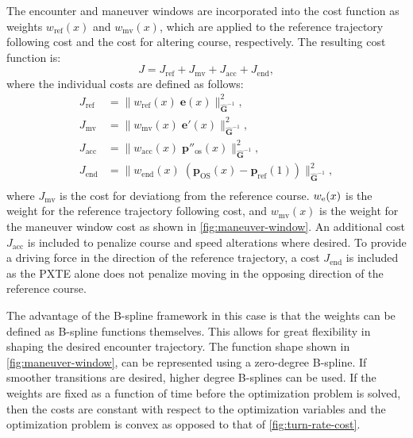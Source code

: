 The encounter and maneuver windows are incorporated into the cost function as weights $w_\text{ref}(x)$ and $w_\text{mv}(x)$, which are applied to the reference trajectory following cost and the cost for altering course, respectively. The resulting cost function is:
\begin{equation}\label{eq:cost-maneuver-window-total}
    J = J_\text{ref} + J_\text{mv} + J_\mathrm{acc} + J_\mathrm{end},
\end{equation}
where the individual costs are defined as follows:
\begin{subequations}\label{eq:cost-maneuver-window}
    \begin{align}
        J_\text{ref} &= \|w_\text{ref}(x)\;\mathbf e(x)\|_{\mathbf{\hat G}^{-1}}^2 , 
        \label{eq:cost-maneuver-window-ref}\\
        J_\text{mv} &= \|w_\text{mv}(x)\;\mathbf e'(x)\|_{\mathbf{\hat G}^{-1}}^2 ,
        \label{eq:cost-maneuver-window-mv}\\
        J_\mathrm{acc} &= \|w_\text{acc}(x)\;\mathbf p''_\text{os}(x)\|_{\mathbf{\hat G}^{-1}}^2 , \label{eq:cost-maneuver-window-acc}\\
        J_\mathrm{end} &= \|w_\text{end}(x)\;(\mathbf p_\text{OS}(x)-\mathbf p_\text{ref}(1))\|_{\mathbf{\hat G}^{-1}}^2 , \label{eq:cost-maneuver-window-end}\\
    \end{align}
\end{subequations}
where $J_\text{mv}$ is the cost for deviationg from the reference course. $w_\text e(x)$ is the weight for the reference trajectory following cost, and $w_\text{mv}(x)$ is the weight for the maneuver window cost as shown in \cref{fig:maneuver-window}. An additional cost $J_\mathrm{acc}$ is included to penalize course and speed alterations where desired. To provide a driving force in the direction of the reference trajectory, a cost $J_\mathrm{end}$ is included as the PXTE alone does not penalize moving in the opposing direction of the reference course.

The advantage of the B-spline framework in this case is that the weights can be defined as B-spline functions themselves. This allows for great flexibility in shaping the desired encounter trajectory. The function shape shown in \cref{fig:maneuver-window}, can be represented using a zero-degree B-spline. If smoother transitions are desired, higher degree B-splines can be used.
If the weights are fixed as a function of time before the optimization problem is solved, then the costs are constant with respect to the optimization variables and the optimization problem is convex as opposed to that of \cref{fig:turn-rate-cost}.

